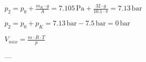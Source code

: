 \( p_{2} = p_{0} + \frac{m_{K} \cdot g}{A} = 7.105 \, \text{Pa} + \frac{32 \cdot g}{10.1 \cdot \pi} = 7.13 \, \text{bar} \)  

\( p_{2} = p_{0} + p_{K} = 7.13 \, \text{bar} - 7.5 \, \text{bar} = 0 \, \text{bar} \)  

\( V_{mix} = \frac{m \cdot R \cdot T}{p} \)  

---